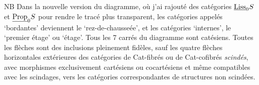 \quad NB Dans la nouvelle version du diagramme, où j'ai rajouté des catégories $\underline{\mathrm{Liss}}_0S$ et $\underline{\mathrm{Prop}}_0S$ pour rendre le tracé plus transparent, les catégories appelés `bordantes' deviennent %
le `rez-de-chausseée', et les catégories `internes', le `premier étage' ou `étage'. Tous %
les 7 carrés du diagramme sont catésiens. Toutes les flèches sont des inclusions pleinement %
fidèles, sauf les quatre flèches horizontales extérieures des catégories de Cat-fibrés ou de Cat-cofibrés \textit{scindés}, avec morphismes exclusivement cartésiens ou cocartésiens et même compatibles avec les scindages, vers les catégories correspondantes de structures non scindées.

